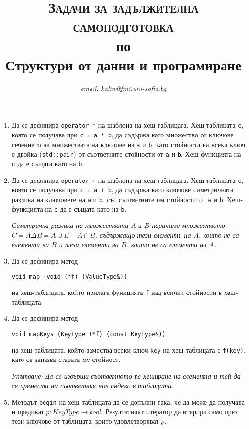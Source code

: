\documentclass[12pt,a4paper]{article}
\author{\textit{email: kalin@fmi.uni-sofia.bg}}
\title{\textsc{Задачи за задължителна самоподготовка} \\
по \\
Структури от данни и програмиране}
\begin{document}
\maketitle


\begin{enumerate}

	\item Да се дефинира \texttt{operator *} на шаблона на хеш-таблицата. Хеш-таблицата \texttt{c}, която се получава при \texttt{c = a * b}, да съдържа като множество от ключове сечението на множествата на ключове на \texttt{a} и \texttt{b}, като стойноста на всеки ключ е двойка (\texttt{std::pair}) от съответните стойности от \texttt{a} и \texttt{b}. Хеш-функцията на \texttt{c} да е същата като на \texttt{b}.

	\item Да се дефинира \texttt{operator +} на шаблона на хеш-таблицата. Хеш-таблицата \texttt{c}, която се получава при \texttt{c = a + b}, да съдържа като ключове симетричната разлика на ключовете на \texttt{a} и \texttt{b}, със съответните им стойности от \texttt{a} и \texttt{b}. Хеш-функцията на \texttt{c} да е същата като на \texttt{b}.

	\emph{Симетрична разлика на множествата $A$ и $B$ наричаме множеството $C = A \Delta B = A \cup B - A \cap B$, съдържащо тези елементи на $A$, които не са елементи на $B$ и тези елементи на $B$, които не са елементи на $A$.}

	\item Да се дефинира метод 

	\texttt{void map (void (*f) (ValueType\&))} 

	на хеш-таблицата, който прилага функцията \texttt{f} над всички стойности в хеш-таблицата.

	\item Да се дефинира метод 

	\texttt{void mapKeys (KeyType (*f) (const KeyType\&))} 

	на хеш-таблицата, който замества всеки ключ \texttt{key} на хеш-таблицата с \texttt{f(key)}, като се запазва старата му стойност. 

	\emph{Упътване: Да се извърши съответното ре-хеширане на елемента и той да се премести на съответния нов индекс в таблицата.}


	\item Методът \texttt{begin} на хеш-таблицата да се допълни така, че да може да получава и предикат $p:KeyType \rightarrow bool$. Резултатният итератор да итерира само през тези ключове от таблицата, които удовлетворяват $p$.



\end{enumerate}
\end{document}
